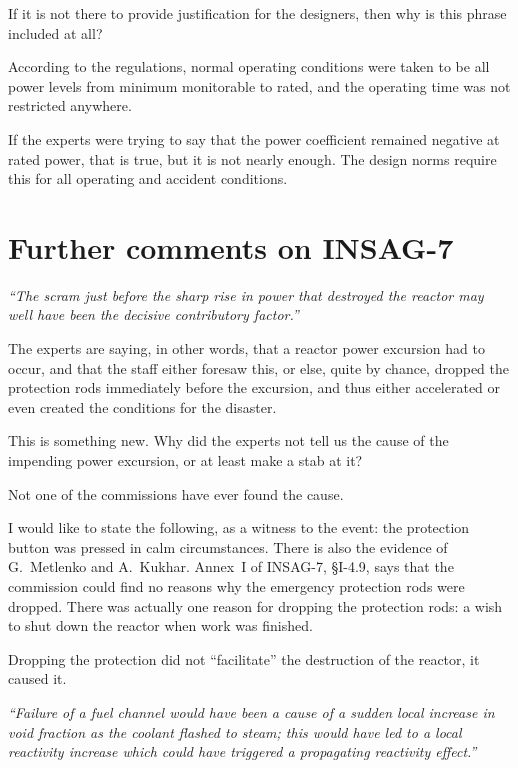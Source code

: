 \documentclass[openright]{bookest}
\begin{document}
If it is not there to provide justification for the designers, then why is this phrase included at all?

According to the regulations, normal operating conditions were taken to be all power levels from minimum monitorable to rated, and the operating time was not restricted anywhere.

If the experts were trying to say that the power coefficient remained negative at rated power, that is true, but it is not nearly enough. The design norms require this for all operating and accident conditions.

\section*{Further comments on INSAG-7}

\begin{personal}[INSAG-7 (§4.1):]
\textit{``The scram just before the sharp rise in power that destroyed the reactor may well have been the decisive contributory factor.''}
\end{personal}

The experts are saying, in other words, that a reactor power excursion had to occur, and that the staff either foresaw this, or else, quite by chance, dropped the protection rods immediately before the excursion, and thus either accelerated or even created the conditions for the disaster.

This is something new. Why did the experts not tell us the cause of the impending power excursion, or at least make a stab at it?

Not one of the commissions have ever found the cause.

I would like to state the following, as a witness to the event: the protection button was pressed in calm circumstances. There is also the evidence of G.~Metlenko and A.~Kukhar. Annex~I of INSAG-7, §I-4.9, says that the commission could find no reasons why the emergency protection rods were dropped. There was actually one reason for dropping the protection rods: a wish to shut down the reactor when work was finished.

Dropping the protection did not ``facilitate'' the destruction of the reactor, it caused it.

\begin{personal}[INSAG-7 (§4.1):]
\textit{``Failure of a fuel channel would have been a cause of a sudden local increase in void fraction as the coolant flashed to steam; this would have led to a local reactivity increase which could have triggered a propagating reactivity effect.''}
\end{personal}
\end{document}
